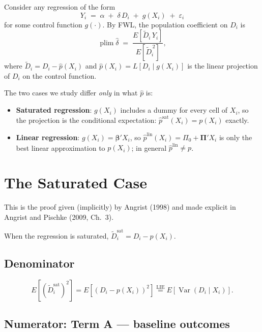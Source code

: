 \documentclass[11pt]{article}
\theoremstyle{remark}
\begin{document}
Consider any regression of the form
\[
  Y_i \;=\; \alpha \;+\; \delta\,D_i \;+\; g(X_i) \;+\; \varepsilon_i
\]
for some control function $g(\cdot)$.  By FWL, the population coefficient on $D_i$ is
\begin{equation}\label{eq:fwl}
  \operatorname{plim} \hat\delta
  \;=\; \frac{E[\tilde D_i\, Y_i]}{E[\tilde D_i^{\,2}]},
\end{equation}
where $\tilde D_i = D_i - \hat p(X_i)$ and $\hat p(X_i) = L[D_i \mid g(X_i)]$ is the
linear projection of $D_i$ on the control function.

The two cases we study differ \emph{only} in what $\hat p$ is:
\begin{itemize}
  \item \textbf{Saturated regression}: $g(X_i)$ includes a dummy for every cell of
        $X_i$, so the projection is the conditional expectation:
        $\hat p^{\mathrm{sat}}(X_i) = p(X_i)$ exactly.
  \item \textbf{Linear regression}: $g(X_i) = \bm\beta' X_i$, so
        $\hat p^{\mathrm{lin}}(X_i) = \Pi_0 + \bm\Pi' X_i$ is only the best linear
        approximation to $p(X_i)$; in general $\hat p^{\mathrm{lin}} \neq p$.
\end{itemize}

\section{The Saturated Case}

This is the proof given (implicitly) by Angrist (1998) and made explicit in
Angrist and Pischke (2009, Ch.\ 3).

When the regression is saturated, $\tilde D_i^{\mathrm{sat}} = D_i - p(X_i)$.

\subsection*{Denominator}

\[
  E\!\left[(\tilde D_i^{\mathrm{sat}})^2\right]
  = E\!\left[(D_i - p(X_i))^2\right]
  \stackrel{\mathrm{LIE}}{=} E\!\left[\operatorname{Var}(D_i \mid X_i)\right].
\]

\subsection*{Numerator: Term A --- baseline outcomes}
\end{document}
